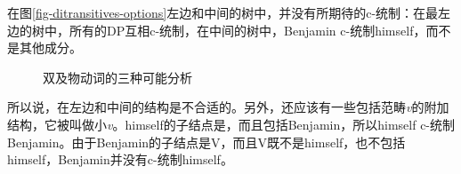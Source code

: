 在图\vref{fig-ditransitives-options}左边和中间的树中，并没有所期待的c-统制：在最左边的树中，所有的DP互相c-统制，在中间的树中，Benjamin c-统制himself，而不是其他成分。
\begin{figure}
\hfill
{}
\hfill
{}
\caption{\label{fig-ditransitives-options}双及物动词的三种可能分析}
\end{figure}%
所以说，在左边和中间的结构是不合适的。另外，还应该有一些包括范畴\textit{v}的附加结构，它被叫做小\emph{v}\citep[\S~4.4]{Adger2003a}。himself的子结点是\vbarc，而且\vbarc 包括Benjamin，所以himself c-统制Benjamin。由于Benjamin的子结点是V，而且V既不是himself，也不包括himself，Benjamin并没有c-统制himself。

